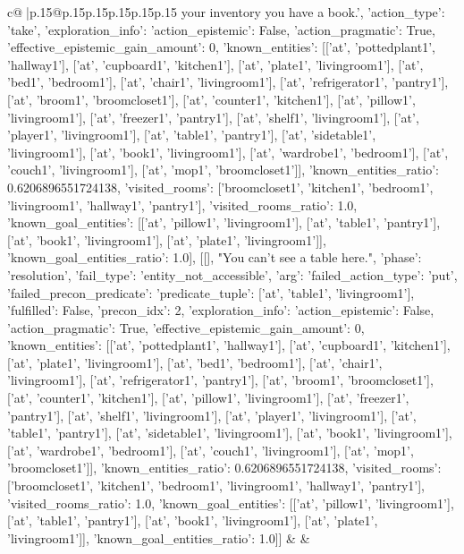 \documentclass{article}
\begin{document}
{\begin{supertabular}{c@{$\;$}|p{.15\linewidth}@{}p{.15\linewidth}p{.15\linewidth}p{.15\linewidth}p{.15\linewidth}p{.15\linewidth}}
{{{your inventory you have a book.', {'action_type': 'take', 'exploration_info': {'action_epistemic': False, 'action_pragmatic': True, 'effective_epistemic_gain_amount': 0, 'known_entities': [['at', 'pottedplant1', 'hallway1'], ['at', 'cupboard1', 'kitchen1'], ['at', 'plate1', 'livingroom1'], ['at', 'bed1', 'bedroom1'], ['at', 'chair1', 'livingroom1'], ['at', 'refrigerator1', 'pantry1'], ['at', 'broom1', 'broomcloset1'], ['at', 'counter1', 'kitchen1'], ['at', 'pillow1', 'livingroom1'], ['at', 'freezer1', 'pantry1'], ['at', 'shelf1', 'livingroom1'], ['at', 'player1', 'livingroom1'], ['at', 'table1', 'pantry1'], ['at', 'sidetable1', 'livingroom1'], ['at', 'book1', 'livingroom1'], ['at', 'wardrobe1', 'bedroom1'], ['at', 'couch1', 'livingroom1'], ['at', 'mop1', 'broomcloset1']], 'known_entities_ratio': 0.6206896551724138, 'visited_rooms': ['broomcloset1', 'kitchen1', 'bedroom1', 'livingroom1', 'hallway1', 'pantry1'], 'visited_rooms_ratio': 1.0, 'known_goal_entities': [['at', 'pillow1', 'livingroom1'], ['at', 'table1', 'pantry1'], ['at', 'book1', 'livingroom1'], ['at', 'plate1', 'livingroom1']], 'known_goal_entities_ratio': 1.0}}], [[], "You can't see a table here.", {'phase': 'resolution', 'fail_type': 'entity_not_accessible', 'arg': {'failed_action_type': 'put', 'failed_precon_predicate': {'predicate_tuple': ['at', 'table1', 'livingroom1'], 'fulfilled': False, 'precon_idx': 2}}, 'exploration_info': {'action_epistemic': False, 'action_pragmatic': True, 'effective_epistemic_gain_amount': 0, 'known_entities': [['at', 'pottedplant1', 'hallway1'], ['at', 'cupboard1', 'kitchen1'], ['at', 'plate1', 'livingroom1'], ['at', 'bed1', 'bedroom1'], ['at', 'chair1', 'livingroom1'], ['at', 'refrigerator1', 'pantry1'], ['at', 'broom1', 'broomcloset1'], ['at', 'counter1', 'kitchen1'], ['at', 'pillow1', 'livingroom1'], ['at', 'freezer1', 'pantry1'], ['at', 'shelf1', 'livingroom1'], ['at', 'player1', 'livingroom1'], ['at', 'table1', 'pantry1'], ['at', 'sidetable1', 'livingroom1'], ['at', 'book1', 'livingroom1'], ['at', 'wardrobe1', 'bedroom1'], ['at', 'couch1', 'livingroom1'], ['at', 'mop1', 'broomcloset1']], 'known_entities_ratio': 0.6206896551724138, 'visited_rooms': ['broomcloset1', 'kitchen1', 'bedroom1', 'livingroom1', 'hallway1', 'pantry1'], 'visited_rooms_ratio': 1.0, 'known_goal_entities': [['at', 'pillow1', 'livingroom1'], ['at', 'table1', 'pantry1'], ['at', 'book1', 'livingroom1'], ['at', 'plate1', 'livingroom1']], 'known_goal_entities_ratio': 1.0}}]] 
	  } 
	   } 
	   } 
	 & & \\ 
 

    \theutterance {}  


\end{supertabular}}
\end{document}
